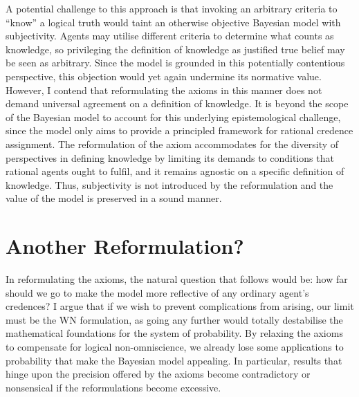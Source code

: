 \documentclass[12pt]{article}
\begin{document}
A potential challenge to this approach is that invoking an arbitrary criteria to ``know'' a logical truth would taint an otherwise objective Bayesian model with subjectivity. Agents may utilise different criteria to determine what counts as knowledge, so privileging the definition of knowledge as justified true belief may be seen as arbitrary. Since the model is grounded in this potentially contentious perspective, this objection would yet again undermine its normative value. However, I contend that reformulating the axioms in this manner does not demand universal agreement on a definition of knowledge. It is beyond the scope of the Bayesian model to account for this underlying epistemological challenge, since the model only aims to provide a principled framework for rational credence assignment. The reformulation of the axiom accommodates for the diversity of perspectives in defining knowledge by limiting its demands to conditions that rational agents ought to fulfil, and it remains agnostic on a specific definition of knowledge. Thus, subjectivity is not introduced by the reformulation and the value of the model is preserved in a sound manner.

\section{Another Reformulation?}
In reformulating the axioms, the natural question that follows would be: how far should we go to make the model more reflective of any ordinary agent's credences? I argue that if we wish to prevent complications from arising, our limit must be the WN formulation, as going any further would totally destabilise the mathematical foundations for the system of probability. By relaxing the axioms to compensate for logical non-omniscience, we already lose some applications to probability that make the Bayesian model appealing.\autocite[436]{oup} In particular, results that hinge upon the precision offered by the axioms become contradictory or nonsensical if the reformulations become excessive.
\end{document}
